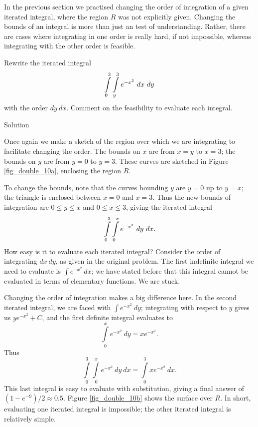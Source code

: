In the previous section we practised changing the order of integration of a given iterated integral, where the region $R$ was not explicitly given. Changing the bounds of an integral is more than just an test of understanding. Rather, there are cases where integrating in one order is really hard, if not impossible, whereas integrating with the other order is feasible.

\begin{example}\label{ex_double6}
Rewrite the iterated integral 
$$\displaystyle \int\limits_0^3\int\limits_y^3 e^{-x^2}\ dx\ dy$$
with the order $dy\ dx$. Comment on the feasibility to evaluate each integral.

Solution 

Once again we make a sketch of the region over which we are integrating to facilitate changing the order. The bounds on $x$ are from $x=y$ to $x=3$; the bounds on $y$ are from $y=0$ to $y=3$. These curves are sketched in Figure \ref{fig_double_10a}, enclosing the region $R$.

To change the bounds, note that the curves bounding $y$ are $y=0$ up to $y=x$; the triangle is enclosed between $x=0$ and $x=3$. Thus the new bounds of integration are $0\leq y\leq x$ and $0\leq x\leq 3$, giving the iterated integral $$\displaystyle \int\limits_0^3\int\limits_0^x e^{-x^2}\ dy\ dx.$$ How easy is it to evaluate each iterated integral? Consider the order of integrating $dx\ dy$, as given in the original problem. The first indefinite integral we need to evaluate is $\int\limits e^{-x^2}\ dx$; we have stated before  that this integral cannot be evaluated in terms of elementary functions. We are stuck.

Changing the order of integration makes a big difference here. In the second iterated integral, we are faced with $\int\limits e^{-x^2}\ dy$; integrating with respect to $y$ gives us $ye^{-x^2}+C$, and the first definite integral evaluates to 
$$\int\limits_0^x e^{-x^2}\ dy = xe^{-x^2}.$$
Thus 
$$\int\limits_0^3\int\limits_0^x e^{-x^2}\ dy\ dx = \int\limits_0^3 xe^{-x^2}\ dx.$$
This last integral is easy to evaluate with substitution, giving a final answer of $(1-e^{-9})/2\approx 0.5$. Figure \ref{fig_double_10b} shows the surface over $R$. In short, evaluating one iterated integral is impossible; the other iterated integral is relatively simple.


\end{example}
